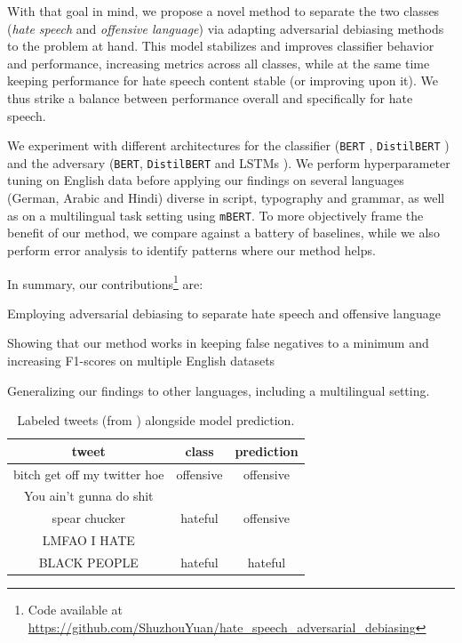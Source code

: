 \documentclass[11pt]{article}
\begin{document}
	With that goal in mind, we propose a novel method to separate the two classes (\textit{hate speech} and \textit{offensive language}) via adapting adversarial debiasing methods to the problem at hand. This model stabilizes and improves classifier behavior and performance, increasing metrics across all classes, while at the same time keeping performance for hate speech content stable (or improving upon it). We thus strike a balance between performance overall and specifically for hate speech.
	
	We experiment with different architectures for the classifier (\texttt{BERT} \cite{devlin2019bert}, \texttt{DistilBERT} \cite{sanh2020distilbert}) and the adversary (\texttt{BERT}, \texttt{DistilBERT} and LSTMs \cite{lstm}). We perform hyperparameter tuning on English data before applying our findings on several languages (German, Arabic and Hindi) diverse in script, typography and grammar, as well as on a multilingual task setting using \texttt{mBERT}. To more objectively frame the benefit of our method, we compare against a battery of baselines, while we also perform error analysis to identify patterns where our method helps.
	
	In summary, our contributions\footnote{Code available at \url{https://github.com/ShuzhouYuan/hate_speech_adversarial_debiasing}} are: \begin{enumerate*}[label={\textbf{\roman{*})}}]
		\item Employing adversarial debiasing to separate hate speech and offensive language
		\item Showing that our method works in keeping false negatives to a minimum and increasing F1-scores on multiple English datasets
		\item Generalizing our findings to other languages, including a multilingual setting.
	\end{enumerate*}
	
	\begin{table}
		\centering
		\small
		\footnotesize
		\begin{tabular}{ccc}
			\hline\rule{0pt}{0.85\normalbaselineskip} \textbf{tweet} & \textbf{class} & \textbf{prediction} \\
			\hline\rule{0pt}{0.85\normalbaselineskip} bitch get off my twitter hoe  & offensive & offensive\\
			\hline\rule{0pt}{0.85\normalbaselineskip} You ain't gunna do shit\\spear chucker & hateful & offensive\\
			\hline\rule{0pt}{0.85\normalbaselineskip} LMFAO I HATE\\BLACK PEOPLE & hateful & hateful\\\hline
		\end{tabular}
		\caption{Labeled tweets (from \citet{davidson}) alongside model prediction.
			\label{example}}
	\end{table}
	
\end{document}

